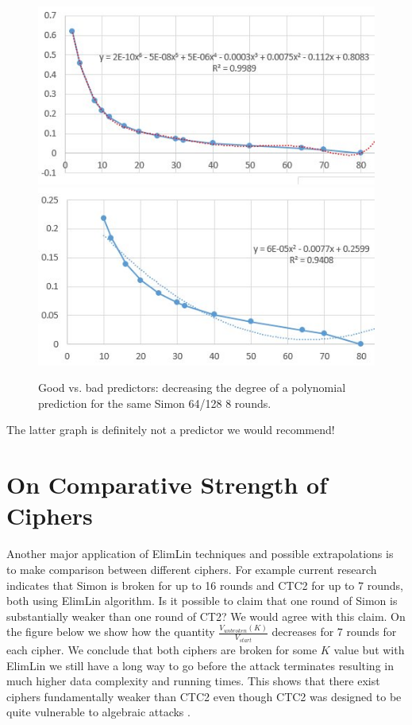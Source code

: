 \begin{figure}[h!]
	\vspace{-0.2cm}
	\centering
	\includegraphics*[width=120mm]{./pics/KUS8_deg6.jpg}
	\includegraphics*[width=120mm]{./pics/KUS8_deg2.jpg}
    \caption{Good vs. bad predictors:
	decreasing the degree of a polynomial prediction
	for the same Simon 64/128 8 rounds. %
}
    \label{ElimLinUnrokenCurveUpDownSimon8BadPRedictorCurDeg2}
	\vspace{-0.1cm}
\end{figure}

The latter graph is definitely not a predictor we would recommend!

\section{On Comparative Strength of Ciphers}
\label{SimonWeakerThanCTC2}

Another major application of ElimLin techniques and possible extrapolations
is to make comparison between different ciphers.
For example current research indicates that Simon is broken for up to 16 rounds
\cite{RaddumSimon} and CTC2 for up to 7 rounds, both using ElimLin algorithm.
Is it possible to claim that one round of Simon is substantially weaker than one round of CT2?
We would agree with this claim. On the figure below we show how the quantity
$\frac{V_{unbroken}(K)}{V_{start}}$ decreases for 7 rounds for each cipher.
We conclude that both ciphers are broken for some $K$ value but with ElimLin we still have a long way to go before the attack terminates resulting in much higher data complexity and running times.
%
This shows that there exist ciphers fundamentally weaker than CTC2 even though CTC2 was designed
to be quite vulnerable to algebraic attacks \cite{FastAlg,FastAlg2}.

